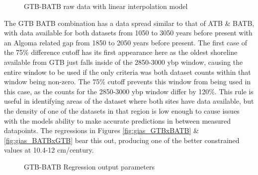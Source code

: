 \begin{figure}[h]
	\caption{GTB-BATB raw data with linear interpolation model}
	\label{fig:data_GTBxBATB}
\end{figure}
The GTB BATB combination has a data spread similar to that of ATB \& BATB, with
data available for both datasets from 1050 to 3050 years before present with an
Algoma related gap from 1850 to 2050 years before present. The first case of the
75\% difference cutoff has its first appearance here as the oldest shoreline available from GTB
just falls inside of the 2850-3000 ybp window, causing the entire window to be
used if the only criteria was both dataset counts within that window being non-zero.
The 75\% cutoff prevents this window from being used in this case, as the counts
for the 2850-3000 ybp window differ by 120\%. This rule is useful in identifying
areas of the dataset where both sites have data available, but the density of
one of the datasets in that region is low enough to cause issues with the models
ability to make accurate predictions in between measured datapoints.
The regressions in
Figures \ref{fig:gias_GTBxBATB} \& \ref{fig:gias_BATBxGTB} bear this out,
producing one of the better constrained values at 10.4-12 cm/century.


\begin{figure}[h]
	\begin{flushleft}
	\end{flushleft}
	\caption{GTB-BATB Regression output parameters}
	\label{fig:GTBxBATB_regression}
\end{figure}

